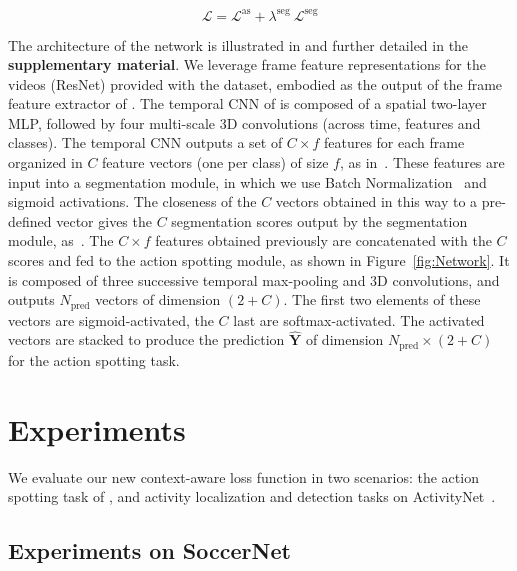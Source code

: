 \documentclass[10pt,twocolumn,letterpaper]{article}
\begin{document}
\begin{equation}
    \mathcal{L} = \mathcal{L}^\text{as} + \lambda^\text{seg}\ \mathcal{L}^\text{seg}
    \label{eq:LossFinal}
\end{equation}




The architecture of the network is illustrated in  and further detailed in the \textbf{supplementary material}. We leverage frame feature representations for the videos (\eg ResNet) provided with the dataset, embodied as the output of the frame feature extractor of . The temporal CNN of  is composed of a spatial two-layer MLP, followed by four multi-scale 3D convolutions (\ie across time, features and classes). The temporal CNN outputs a set of $C \times f$ features for each frame organized in $C$ feature vectors (one per class) of size $f$, as in~\cite{Sabour2017Dynamic}. These features are input into a segmentation module, in which we use Batch Normalization~\cite{Ioffe2015BatchNorm} and sigmoid activations. The closeness of the $C$ vectors obtained in this way to a pre-defined vector gives the $C$ segmentation scores output by the segmentation module, as~\cite{Deliege2018HitNet}. The $C \times f$ features obtained previously are concatenated with the $C$ scores and fed to the action spotting module, as shown in Figure~\ref{fig:Network}. It is composed of three successive temporal max-pooling and 3D convolutions, and outputs $N_\text{pred}$ vectors of dimension $(2+C)$. The first two elements of these vectors are sigmoid-activated, the $C$ last are softmax-activated. The activated vectors are stacked to produce the prediction $\hat{\textbf{Y}}$ of dimension $N_\text{pred} \times (2+C)$ for the action spotting task.


 \section{Experiments}
\label{sec:Exp}

We evaluate our new context-aware loss function in two scenarios: the action spotting task of \SoccerNet, and activity localization and detection tasks on ActivityNet~\cite{caba2015activitynet}.

\subsection{Experiments on SoccerNet}
\end{document}
